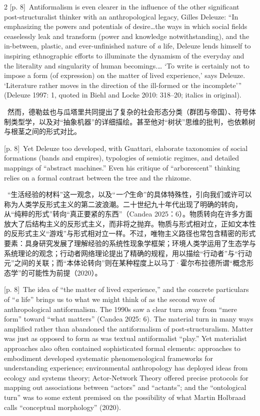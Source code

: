 \documentclass[10pt,a4paper]{article}
\begin{document}
\begin{paracol}{2}
{\scriptsize\color{gray} [p. 8]}\ Antiformalism is even clearer in the influence of the other significant post-structuralist thinker with an anthropological legacy, Gilles Deleuze: “In emphasizing the powers and potentials of desire…the ways in which social fields ceaselessly leak and transform (power and knowledge notwithstanding), and the in-between, plastic, and ever-unfinished nature of \textit{a} life, Deleuze lends himself to inspiring ethnographic efforts to illuminate the dynamism of the everyday and the literality and singularity of human becomings.… ‘To write is certainly not to impose a form (of expression) on the matter of lived experience,’ says Deleuze. ‘Literature rather moves in the direction of the ill-formed or the incomplete’” (Deleuze 1997: 1, quoted in Biehl and Locke 2010: 318–20; italics in original).\par
\switchcolumn*
{\scriptsize\color{gray} [p. 8]}\ 然而，德勒兹也与瓜塔里共同提出了复杂的社会形态分类（群团与帝国）、符号体制类型学，以及对“抽象机器”的详细描绘。甚至他对“树状”思维的批判，也依赖树与根茎之间的形式对比。\par
\switchcolumn
{\scriptsize\color{gray} [p. 8]}\ Yet Deleuze too developed, with Guattari, elaborate taxonomies of social formations (bands and empires), typologies of semiotic regimes, and detailed mappings of “abstract machines.” Even his critique of “arborescent” thinking relies on a formal contrast between the tree and the rhizome.\par
\switchcolumn*
{\scriptsize\color{gray} [p. 8]}\ “生活经验的材料”这一观念，以及“\textit{一个}生命”的具体特殊性，引向我们或许可以称为人类学反形式主义的第二波浪潮。二十世纪九十年代出现了明确的转向，从“纯粹的形式”转向“真正要紧的东西”（Candea 2025：6）。物质转向在许多方面放大了后结构主义的反形式主义，而非将之抛弃。物质与形式相对立，正如文本性的反形式主义“游戏”与形式相对立一样。不过，唯物主义路径也常包含精密的形式要素：具身研究发展了理解经验的系统性现象学框架；环境人类学运用了生态学与系统理论的观念；行动者网络理论提出了精确的规程，用以描绘“行动者”与“行动元”之间的关联；而“本体论转向”则在某种程度上以马丁·霍尔布拉德所谓“概念形态学”的可能性为前提（2020）。\par
\switchcolumn
{\scriptsize\color{gray} [p. 8]}\ The idea of “the matter of lived experience,” and the concrete particulars of “\textit{a} life” brings us to what we might think of as the second wave of anthropological antiformalism. The 1990s saw a clear turn away from “mere form” toward “what matters” (Candea 2025: 6). The material turn in many ways amplified rather than abandoned the antiformalism of post-structuralism. Matter was just as opposed to form as was textual antiformalist “play.” Yet materialist approaches also often contained sophisticated formal elements: approaches to embodiment developed systematic phenomenological frameworks for understanding experience; environmental anthropology has deployed ideas from ecology and systems theory; Actor-Network Theory offered precise protocols for mapping out associations between “actors” and “actants”; and the “ontological turn” was to some extent premised on the possibility of what Martin Holbraad calls “conceptual morphology” (2020).\par

\end{paracol}
\end{document}
